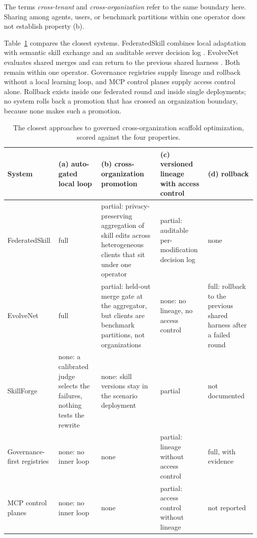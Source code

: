 The terms \emph{cross-tenant} and \emph{cross-organization} refer to the same boundary here. Sharing among agents, users, or benchmark partitions within one operator does not establish property (b).

Table~\ref{tab:closest} compares the closest systems. FederatedSkill combines local adaptation with semantic skill exchange and an auditable server decision log \citep{yang2026federatedskill}. EvolveNet evaluates shared merges and can return to the previous shared harness \citep{nie2026evolvenet}. Both remain within one operator. Governance registries supply lineage and rollback without a local learning loop, and MCP control planes supply access control alone. Rollback exists inside one federated round and inside single deployments; no system rolls back a promotion that has crossed an organization boundary, because none makes such a promotion.

\begin{table}[h]
\centering\small
\begin{tabular}{>{\raggedright\arraybackslash}p{}>{\raggedright\arraybackslash}p{}>{\raggedright\arraybackslash}p{}>{\raggedright\arraybackslash}p{}>{\raggedright\arraybackslash}p{}}
\toprule
System & (a) auto-gated local loop & (b) cross-organization promotion & (c) versioned lineage with access control & (d) rollback \\
\midrule
FederatedSkill \citep{yang2026federatedskill} & full & partial: privacy-preserving aggregation of skill edits across heterogeneous clients that sit under one operator & partial: auditable per-modification decision log & none \\
EvolveNet \citep{nie2026evolvenet} & full & partial: held-out merge gate at the aggregator, but clients are benchmark partitions, not organizations & none: no lineage, no access control & full: rollback to the previous shared harness after a failed round \\
SkillForge \citep{skillforge2026} & none: a calibrated judge selects the failures, nothing tests the rewrite & none: skill versions stay in the scenario deployment & partial & not documented \\
Governance-first registries \citep{kang2026registry,qin2026governed,quessadavial2026acm} & none: no inner loop & none & partial: lineage without access control & full, with evidence \\
MCP control planes \citep{agenticcommunity2026mcpgateway} & none: no inner loop & none & partial: access control without lineage & not reported \\
\bottomrule
\end{tabular}
\caption{The closest approaches to governed cross-organization scaffold optimization, scored against the four properties.}
\label{tab:closest}
\end{table}

